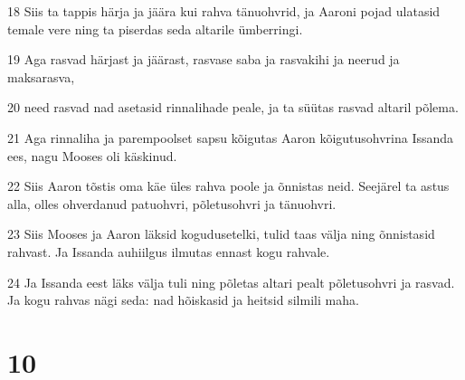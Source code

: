 \par 18 Siis ta tappis härja ja jäära kui rahva tänuohvrid, ja Aaroni pojad ulatasid temale vere ning ta piserdas seda altarile ümberringi.
\par 19 Aga rasvad härjast ja jäärast, rasvase saba ja rasvakihi ja neerud ja maksarasva,
\par 20 need rasvad nad asetasid rinnalihade peale, ja ta süütas rasvad altaril põlema.
\par 21 Aga rinnaliha ja parempoolset sapsu kõigutas Aaron kõigutusohvrina Issanda ees, nagu Mooses oli käskinud.
\par 22 Siis Aaron tõstis oma käe üles rahva poole ja õnnistas neid. Seejärel ta astus alla, olles ohverdanud patuohvri, põletusohvri ja tänuohvri.
\par 23 Siis Mooses ja Aaron läksid kogudusetelki, tulid taas välja ning õnnistasid rahvast. Ja Issanda auhiilgus ilmutas ennast kogu rahvale.
\par 24 Ja Issanda eest läks välja tuli ning põletas altari pealt põletusohvri ja rasvad. Ja kogu rahvas nägi seda: nad hõiskasid ja heitsid silmili maha.

\chapter{10}

